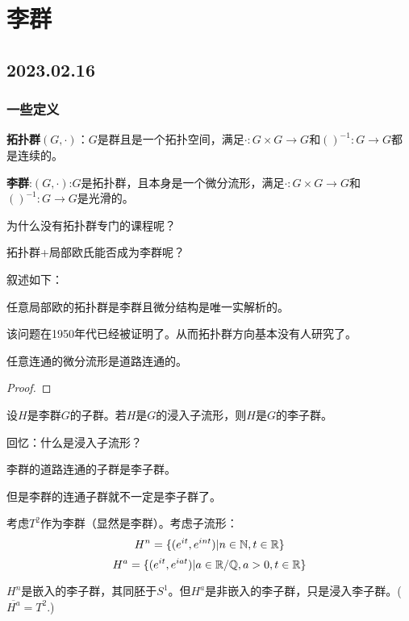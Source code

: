 \ifx\allfiles\undefined

	
	
\else
\fi

\part{李群}
\chapter{2023.02.16}
\section{一些定义}
\begin{definition}
\textbf{拓扑群}$(G, \cdot )$：$G$是群且是一个拓扑空间，满足$\cdot:G \times G \to G$和$()^{-1}:G \to G$都是连续的。

\textbf{李群}:$(G,\cdot)$:$G$是拓扑群，且本身是一个微分流形，满足$\cdot: G \times G \to G$和$()^{-1}:G \to G$是光滑的。
\end{definition}

为什么没有拓扑群专门的课程呢？
\begin{proposition}[Hilbert第五问题]
    拓扑群+局部欧氏能否成为李群呢？

    叙述如下：

    任意局部欧的拓扑群是李群且微分结构是唯一实解析的。
\end{proposition}
该问题在1950年代已经被证明了。从而拓扑群方向基本没有人研究了。
\begin{proposition}
    任意连通的微分流形是道路连通的。
\end{proposition}
\begin{proof}
    
\end{proof}
\begin{definition}[李子群]
    设$H$是李群$G$的子群。若$H$是$G$的浸入子流形，则$H$是$G$的李子群。
\end{definition}
回忆：什么是浸入子流形？

\begin{proposition}[Yamabe]
    李群的道路连通的子群是李子群。
\end{proposition}
但是李群的连通子群就不一定是李子群了。
\begin{example}[李子群但不是嵌入李子群]
    考虑$T^2$作为李群（显然是李群）。考虑子流形：
    $$
    H^n=\{(e^{it},e^{int})|n \in \mathbb{N},t \in \mathbb{R}\}
    $$
    $$
    H^a=\{(e^{it},e^{iat})|a \in \mathbb{R}/\mathbb{Q},a>0,t \in \mathbb{R}\}
    $$
    
    $H^n$是嵌入的李子群，其同胚于$S^1$。但$H^a$是非嵌入的李子群，只是浸入李子群。($\overline{H^a}=T^2$.)
\end{example}
